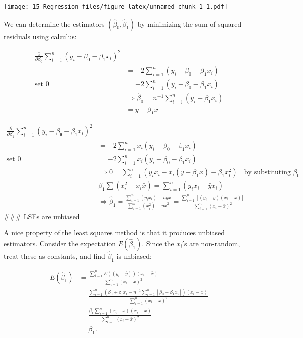\documentclass[
]{book}
\begin{document}
\texttt{[image: 15-Regression\_files/figure-latex/unnamed-chunk-1-1.pdf]}

We can determine the estimators \((\hat\beta_0, \hat\beta_1)\) by minimizing the sum of squared residuals using calculus:

\[
\begin{aligned}
\frac{\partial}{\partial\beta_0} \sum_{i=1}^n(y_i - \beta_0 - \beta_1x_i)^2 \\
& = -2\sum_{i=1}^n(y_i - \beta_0 - \beta_1x_i)\\
\text{set  }0 &= -2\sum_{i=1}^n(y_i - \beta_0 - \beta_1x_i)\\
&\Rightarrow \hat\beta_0 = n^{-1}\sum_{i=1}^n(y_i - \beta_1x_i)\\
& = \bar y - \beta_1\bar x
\end{aligned}
\]

\[
\begin{aligned}
\frac{\partial}{\partial\beta_1} \sum_{i=1}^n(y_i - \beta_0 - \beta_1x_i)^2 \\
& = -2 \sum_{i=1}^n x_i(y_i - \beta_0 - \beta_1x_i)\\
\text{set  }0 &= -2 \sum_{i=1}^n x_i(y_i - \beta_0 - \beta_1x_i)\\
&\Rightarrow 0 = \sum_{i=1}^n (y_ix_i - x_i(\bar y - \beta_1 \bar x) - \beta_1 x_i^2)\quad \text{by substituting }\beta_0\\
& \beta_1\sum(x_i^2 - x_i\bar x) = \sum_{i=1}^n(y_ix_i - \bar y x_i)\\
&\Rightarrow \hat\beta_1 = \frac{\sum_{i=1}^n (y_ix_i) - n\bar y\bar x}{\sum_{i=1}^n 
(x_i^2) - n\bar x^2} = \frac{\sum_{i=1}^n [(y_i - \bar y)(x_i - \bar x)]}{\sum_{i=1}^n (x_i - \bar x)^2}
\end{aligned}
\]
\#\#\# LSEs are unbiased

A nice property of the least squares method is that it produces unbiased estimators. Consider the expectation \(E(\hat\beta_1)\). Since the \(x_i'\)s are non-random, treat these as constants, and find \(\hat\beta_1\) is unbiased:

\[
\begin{aligned}
E(\hat\beta_1) & = \frac{\sum_{i=1}^n E((y_i - \bar y))(x_i - \bar x)}{\sum_{i=1}^n (x_i - \bar x)^2}\\
& = \frac{\sum_{i=1}^n (\beta_0 + \beta_1 x_i - n^{-1}\sum_{i=1}^n [\beta_0 +\beta_1 x_i])(x_i - \bar x)}{\sum_{i=1}^n (x_i - \bar x)^2}\\
& = \frac{\beta_1\sum_{i=1}^n ( x_i - \bar x)(x_i - \bar x)}{\sum_{i=1}^n (x_i - \bar x)^2}\\
& = \beta_1.
\end{aligned}
\]
\end{document}
